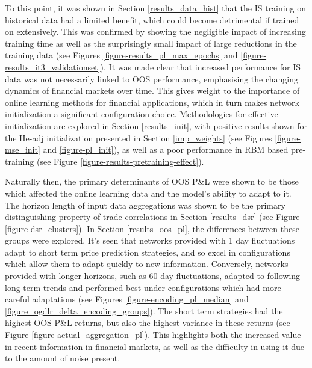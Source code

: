 \documentclass[a4paper,11pt,oneside]{article}
\theoremstyle{plain}
\theoremstyle{definition}
\begin{document}
	To this point, it was shown in Section \ref{results_data_hist} that the IS training on historical data had a limited benefit, which could become detrimental if trained on extensively. This was confirmed by showing the negligible impact of increasing training time as well as the surprisingly small impact of large reductions in the training data (see Figures \ref{figure-results_pl_max_epochs} and \ref{figure-results_it3_validationset}). It was made clear that increased performance for IS data was not necessarily linked to OOS performance, emphasising the changing dynamics of financial markets over time. This gives weight to the importance of online learning methods for financial applications, which in turn makes network initialization a significant configuration choice. Methodologies for effective initialization are explored in Section \ref{results_init}, with positive results shown for the He-adj initialization presented in Section \ref{imp_weights} (see Figures \ref{figure-mse_init} and \ref{figure-pl_init}), as well as a poor performance in RBM based pre-training (see Figure \ref{figure-results-pretraining-effect}).  \newline
	
	Naturally then, the primary determinants of OOS P\&L were shown to be those which affected the online learning data and the model's ability to adapt to it. The horizon length of input data aggregations was shown to be the primary distinguishing property of trade correlations in Section \ref{results_dsr} (see Figure \ref{figure-dsr_clusters}). In Section \ref{results_oos_pl}, the differences between these groups were explored. It's seen that networks provided with 1 day fluctuations adapt to short term price prediction strategies, and so excel in configurations which allow them to adapt quickly to new information. Conversely, networks provided with longer horizons, such as 60 day fluctuations, adapted to following long term trends and performed best under configurations which had more careful adaptations (see Figures \ref{figure-encoding_pl_median} and \ref{figure_ogdlr_delta_encoding_groups}). The short term strategies had the highest OOS P\&L returns, but also the highest variance in these returns (see Figure \ref{figure-actual_aggregation_pl}). This highlights both the increased value in recent information in financial markets, as well as the difficulty in using it due to the amount of noise present.\newline 
	
\end{document}
